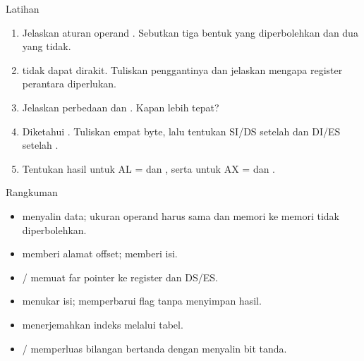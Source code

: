 \documentclass[aspectratio=169,11pt]{beamer}
\begin{document}
\begin{frame}{Latihan}
\small
\begin{enumerate}
    \item Jelaskan aturan operand . Sebutkan tiga bentuk
          yang diperbolehkan dan dua yang tidak.

    \vspace{0.15em}
    \item {} tidak dapat dirakit. Tuliskan
          penggantinya dan jelaskan mengapa register perantara
          diperlukan.

    \vspace{0.15em}
    \item Jelaskan perbedaan  dan
          . Kapan  lebih tepat?

    \vspace{0.15em}
    \item Diketahui . Tuliskan empat byte,
          lalu tentukan SI/DS setelah  dan DI/ES
          setelah .

    \vspace{0.15em}
    \item Tentukan hasil  untuk AL =  dan
          , serta  untuk AX =  dan
          .
\end{enumerate}
\end{frame}

\begin{frame}{Rangkuman}
\small
\begin{itemize}
    \item {} menyalin data; ukuran operand harus sama dan
          memori ke memori tidak diperbolehkan.

    \vspace{0.15em}
    \item {} memberi alamat offset;  memberi isi.

    \vspace{0.15em}
    \item {}/ memuat far pointer ke register dan
          DS/ES.

    \vspace{0.15em}
    \item {} menukar isi;  memperbarui flag
          tanpa menyimpan hasil.

    \vspace{0.15em}
    \item {} menerjemahkan indeks melalui tabel.

    \vspace{0.15em}
    \item {}/ memperluas bilangan bertanda
          dengan menyalin bit tanda.
\end{itemize}
\end{frame}
\end{document}
